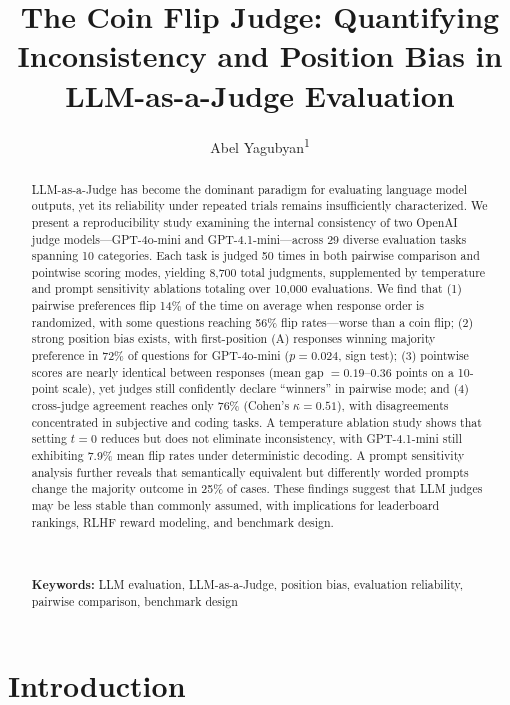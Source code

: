 \documentclass{ijclclp}
\title{The Coin Flip Judge: Quantifying Inconsistency and Position Bias in LLM-as-a-Judge Evaluation}
\author{Abel Yagubyan\textsuperscript{1}}
\affiliation{Independent Researcher}
\begin{document}
\maketitle
\thispagestyle{firstpage}

\begin{abstract}
LLM-as-a-Judge has become the dominant paradigm for evaluating language model outputs, yet its reliability under repeated trials remains insufficiently characterized. We present a reproducibility study examining the internal consistency of two OpenAI judge models---GPT-4o-mini and GPT-4.1-mini---across 29 diverse evaluation tasks spanning 10 categories. Each task is judged 50 times in both pairwise comparison and pointwise scoring modes, yielding 8,700 total judgments, supplemented by temperature and prompt sensitivity ablations totaling over 10,000 evaluations. We find that (1) pairwise preferences flip 14\% of the time on average when response order is randomized, with some questions reaching 56\% flip rates---worse than a coin flip; (2) strong position bias exists, with first-position (A) responses winning majority preference in 72\% of questions for GPT-4o-mini ($p = 0.024$, sign test); (3) pointwise scores are nearly identical between responses (mean gap $= 0.19$--$0.36$ points on a 10-point scale), yet judges still confidently declare ``winners'' in pairwise mode; and (4) cross-judge agreement reaches only 76\% (Cohen's $\kappa = 0.51$), with disagreements concentrated in subjective and coding tasks. A temperature ablation study shows that setting $t=0$ reduces but does not eliminate inconsistency, with GPT-4.1-mini still exhibiting 7.9\% mean flip rates under deterministic decoding. A prompt sensitivity analysis further reveals that semantically equivalent but differently worded prompts change the majority outcome in 25\% of cases. These findings suggest that LLM judges may be less stable than commonly assumed, with implications for leaderboard rankings, RLHF reward modeling, and benchmark design.

\\
\\
\textbf{Keywords:} LLM evaluation, LLM-as-a-Judge, position bias, evaluation reliability, pairwise comparison, benchmark design
\end{abstract}

\section{Introduction}
\end{document}
